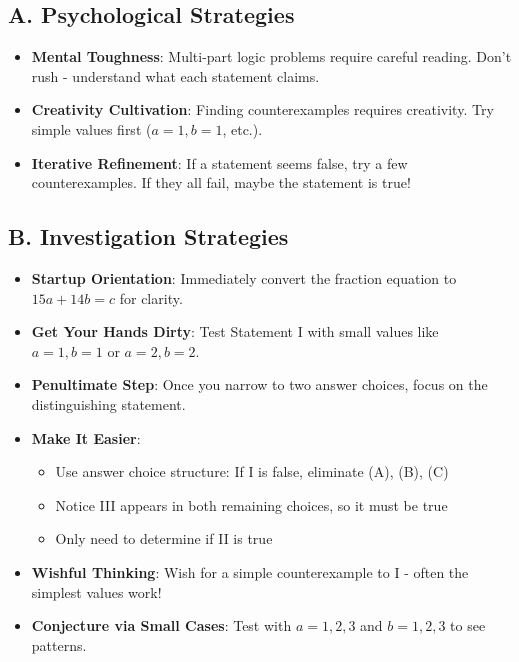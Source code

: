 \documentclass[12pt]{article}
\begin{document}
\begin{strategicbox}
\subsection*{A. Psychological Strategies}
\begin{itemize}[leftmargin=*]
    \item \textbf{Mental Toughness}: Multi-part logic problems require careful reading. Don't rush - understand what each statement claims.
    \item \textbf{Creativity Cultivation}: Finding counterexamples requires creativity. Try simple values first ($a=1, b=1$, etc.).
    \item \textbf{Iterative Refinement}: If a statement seems false, try a few counterexamples. If they all fail, maybe the statement is true!
\end{itemize}

\subsection*{B. Investigation Strategies}
\begin{itemize}[leftmargin=*]
    \item \textbf{Startup Orientation}: Immediately convert the fraction equation to $15a + 14b = c$ for clarity.
    \item \textbf{Get Your Hands Dirty}: Test Statement I with small values like $a=1, b=1$ or $a=2, b=2$.
    \item \textbf{Penultimate Step}: Once you narrow to two answer choices, focus on the distinguishing statement.
    \item \textbf{Make It Easier}: 
    \begin{itemize}
        \item Use answer choice structure: If I is false, eliminate (A), (B), (C)
        \item Notice III appears in both remaining choices, so it must be true
        \item Only need to determine if II is true
    \end{itemize}
    \item \textbf{Wishful Thinking}: Wish for a simple counterexample to I - often the simplest values work!
    \item \textbf{Conjecture via Small Cases}: Test with $a=1, 2, 3$ and $b=1, 2, 3$ to see patterns.
\end{itemize}


\end{strategicbox}
\end{document}

